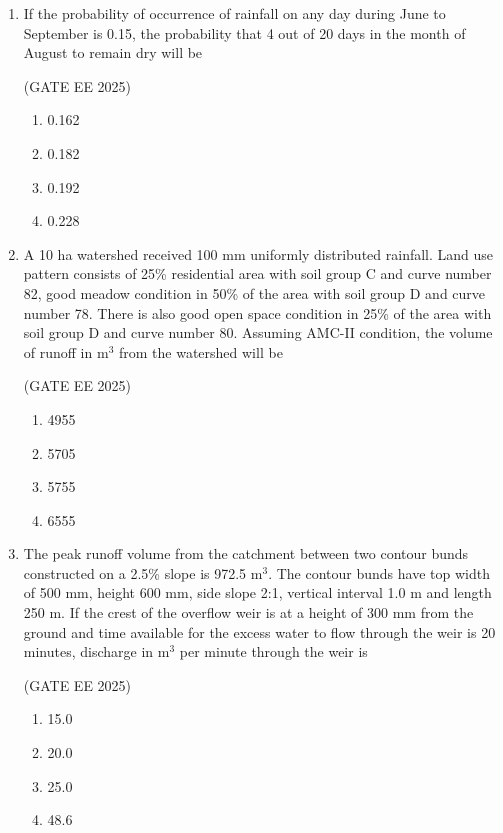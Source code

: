 \documentclass[journal,12pt,onecolumn]{IEEEtran}
\theoremstyle{remark}
\begin{document}
\begin{enumerate}
\item If the probability of occurrence of rainfall on any day during June to September is 0.15, the probability that 4 out of 20 days in the month of August to remain dry will be

\hfill(GATE EE 2025)

\begin{multicols}{4}
\begin{enumerate}
\item 0.162
\item 0.182
\item 0.192
\item 0.228
\end{enumerate}
\end{multicols}

\item A 10 ha watershed received 100 mm uniformly distributed rainfall. Land use pattern consists of 25\% residential area with soil group C and curve number 82, good meadow condition in 50\% of the area with soil group D and curve number 78. There is also good open space condition in 25\% of the area with soil group D and curve number 80. Assuming AMC-II condition, the volume of runoff in m$^{3}$ from the watershed will be

\hfill(GATE EE 2025)

\begin{multicols}{4}
\begin{enumerate}
\item 4955
\item 5705
\item 5755
\item 6555
\end{enumerate}
\end{multicols}

\item The peak runoff volume from the catchment between two contour bunds constructed on a 2.5\% slope is 972.5 m$^{3}$. The contour bunds have top width of 500 mm, height 600 mm, side slope 2:1, vertical interval 1.0 m and length 250 m. If the crest of the overflow weir is at a height of 300 mm from the ground and time available for the excess water to flow through the weir is 20 minutes, discharge in m$^{3}$ per minute through the weir is

\hfill(GATE EE 2025)

\begin{multicols}{4}
\begin{enumerate}
\item 15.0
\item 20.0
\item 25.0
\item 48.6
\end{enumerate}
\end{multicols}


\end{enumerate}
\end{document}
